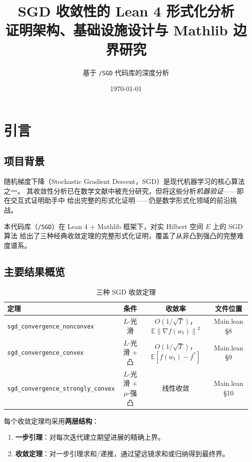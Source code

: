 \documentclass[12pt, a4paper]{article}
\title{%
  \textbf{SGD 收敛性的 Lean 4 形式化分析}\\[0.5em]
  \large 证明架构、基础设施设计与 Mathlib 边界研究
}
\author{基于 \texttt{/SGD} 代码库的深度分析}
\date{\today}
\newcommand{\E}{\mathbb{E}}
\newcommand{\gradF}{\nabla f}
\newcommand{\norm}[1]{\left\| #1 \right\|}
\newcommand{\lean}[1]{\texttt{#1}}
\begin{document}

\maketitle
\tableofcontents
\newpage

\section{引言}

\subsection{项目背景}

随机梯度下降（Stochastic Gradient Descent，SGD）是现代机器学习的核心算法之一。
其收敛性分析已在数学文献中被充分研究，但将这些分析\emph{机器验证}——即在交互式证明助手中
给出完整的形式化证明——仍是数学形式化领域的前沿挑战。

本代码库（\texttt{/SGD}）在 Lean 4 + Mathlib 框架下，对实 Hilbert 空间 $E$ 上的 SGD 算法
给出了三种经典收敛定理的完整形式化证明，覆盖了从非凸到强凸的完整难度谱系。

\subsection{主要结果概览}

\begin{table}[H]
\centering
\caption{三种 SGD 收敛定理}
\begin{tabular}{lccc}
\toprule
\textbf{定理} & \textbf{条件} & \textbf{收敛率} & \textbf{文件位置} \\
\midrule
\lean{sgd\_convergence\_nonconvex} & $L$-光滑 & $O(1/\sqrt{T})$，$\E\norm{\gradF(w_t)}^2$ & Main.lean §8 \\
\lean{sgd\_convergence\_convex}    & $L$-光滑 + 凸 & $O(1/\sqrt{T})$，$\E[f(w_t)-f^*]$ & Main.lean §9 \\
\lean{sgd\_convergence\_strongly\_convex} & $L$-光滑 + $\mu$-强凸 & 线性收敛 & Main.lean §10 \\
\bottomrule
\end{tabular}
\end{table}

每个收敛定理均采用\textbf{两层结构}：
\begin{enumerate}
  \item \textbf{一步引理}：对每次迭代建立期望进展的精确上界。
  \item \textbf{收敛定理}：对一步引理求和/递推，通过望远镜求和或归纳得到最终界。
\end{enumerate}
\end{document}

